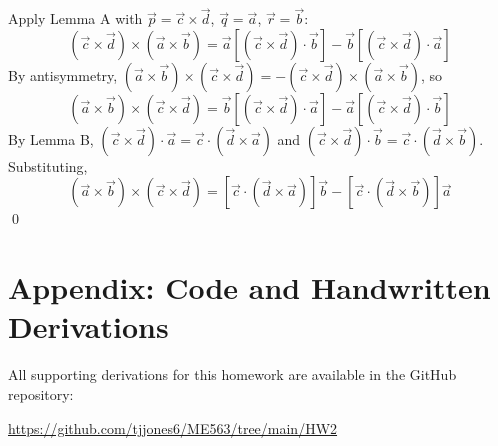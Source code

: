 \documentclass[12pt]{article}
\begin{document}
Apply Lemma A with $\vec p = \vec c\times\vec d$, $\vec q = \vec a$, $\vec r = \vec b$:
\begin{equation*}
    (\vec c\times\vec d)\times(\vec a\times\vec b) = \vec a\left[(\vec c\times\vec d)\cdot\vec b\right] - \vec b\left[(\vec c\times\vec d)\cdot\vec a\right]
\end{equation*}
By antisymmetry, $(\vec a\times\vec b)\times(\vec c\times\vec d) = -(\vec c\times\vec d)\times(\vec a\times\vec b)$, so
\begin{equation*}
    (\vec a\times\vec b)\times(\vec c\times\vec d) = \vec b\left[(\vec c\times\vec d)\cdot\vec a\right] - \vec a\left[(\vec c\times\vec d)\cdot\vec b\right]
\end{equation*}
By Lemma B, $(\vec c\times\vec d)\cdot\vec a = \vec c\cdot(\vec d\times\vec a)$ and $(\vec c\times\vec d)\cdot\vec b = \vec c\cdot(\vec d\times\vec b)$. Substituting,
\begin{equation}
    \boxed{(\vec a\times\vec b)\times(\vec c\times\vec d) = \left[\vec c\cdot(\vec d\times\vec a)\right]\vec b - \left[\vec c\cdot(\vec d\times\vec b)\right]\vec a}
\end{equation}
\qed

\appendix
\section*{Appendix: Code and Handwritten Derivations}

All supporting derivations for this homework are available in the GitHub repository:
\begin{center}
    \url{https://github.com/tjjones6/ME563/tree/main/HW2}
\end{center}
\end{document}
